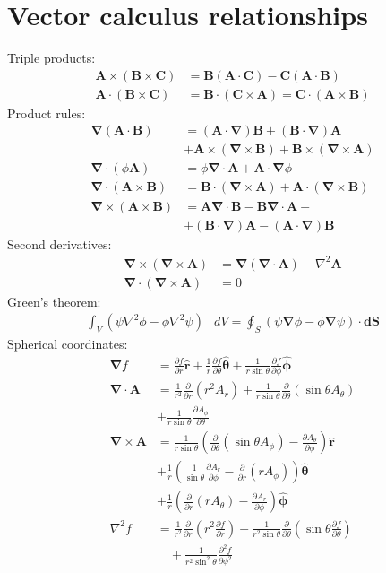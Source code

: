 \documentclass[10pt,twocolumn]{article}
\newcommand{\D}{\mathbf{\nabla}}
\newcommand{\A}{\mathbf{A}}
\newcommand{\B}{\mathbf{B}}
\newcommand{\C}{\mathbf{C}}
\newcommand{\dS}{\mathbf{dS}}
\newcommand{\laplacian}{\nabla^2}
\newcommand{\rhat}{\mathbf{\hat{r}}}
\newcommand{\thetahat}{\mathbf{\hat{\theta}}}
\newcommand{\phihat}{\mathbf{\hat{\phi}}}
\begin{document}
  \section{Vector calculus relationships}
  Triple products:
  \begin{align*}
    \A\times(\B\times\C) &= \B(\A\cdot\C) - \C(\A\cdot\B) \\
    \A\cdot(\B\times\C) &= \B\cdot(\C\times\A) = \C\cdot(\A\times\B)
  \end{align*}
  Product rules:
  \begin{align*}
    \D(\A\cdot\B) &= (\A\cdot\D)\B+(\B\cdot\D)\A \\
    &+\A\times(\D\times\B)+\B\times(\D\times\A) \\
    \D\cdot(\phi\A) &= \phi\D\cdot\A + \A\cdot\D\phi \\
    \D\cdot(\A\times\B) &= \B\cdot(\D\times\A) + \A\cdot(\D\times\B) \\
    \D\times(\A\times\B) &= \A\D\cdot\B - \B\D\cdot\A + \\
    &+ (\B\cdot\D)\A - (\A\cdot\D)\B
  \end{align*}
  Second derivatives:
  \begin{align*}
    \D\times(\D\times\A) &= \D(\D\cdot\A) - \laplacian\A \\
    \D\cdot(\D\times\A) &=0
  \end{align*}
  Green's theorem:
  \begin{align*}
    \int_V\left(\psi\laplacian\phi-\phi\laplacian\psi\right)&dV
    = \oint_S\left(\psi\D\phi - \phi\D\psi\right)\cdot\dS
  \end{align*}
  Spherical coordinates:
  \begin{align*}
    \D f &= \frac{\partial f}{\partial r}\rhat
    + \frac1r\frac{\partial f}{\partial\theta}\thetahat
    + \frac1{r\sin\theta}\frac{\partial f}{\partial\phi}\phihat \\
    \D\cdot\A &= \frac1{r^2}\frac{\partial}{\partial r}
          \left(r^2A_r\right)
    + \frac1{r\sin\theta}\frac{\partial}{\partial\theta}
          \left(\sin\theta A_\theta\right) \\
    &+ \frac1{r\sin\theta}\frac{\partial A_\phi}{\partial\theta} \\
    \D\times\A &=
    \frac1{r\sin\theta} \left(
         \frac{\partial}{\partial\theta}\left(\sin\theta A_\phi\right)
         - \frac{\partial A_\theta}{\partial\phi}
    \right) \rhat \\
    &+ \frac1r\left(
         \frac1{\sin\theta}\frac{\partial A_r}{\partial \phi}
         - \frac{\partial}{\partial r}\left(rA_\phi\right)
    \right)\thetahat \\
    &+ \frac1r\left(
         \frac{\partial}{\partial r}\left(rA_\theta\right)
         -\frac{\partial A_r}{\partial\phi}
    \right)\phihat
    \\
    \laplacian f &=
    \frac1{r^2}\frac{\partial}{\partial r}\left(r^2\frac{\partial
    f}{\partial r}\right)
    + \frac1{r^2\sin\theta}\frac{\partial}{\partial\theta}
      \left(\sin\theta\frac{\partial f}{\partial\theta}\right)\\
    &\quad+ \frac1{r^2\sin^2\theta}\frac{\partial^2f}{\partial\phi^2}
  \end{align*}
\end{document}
